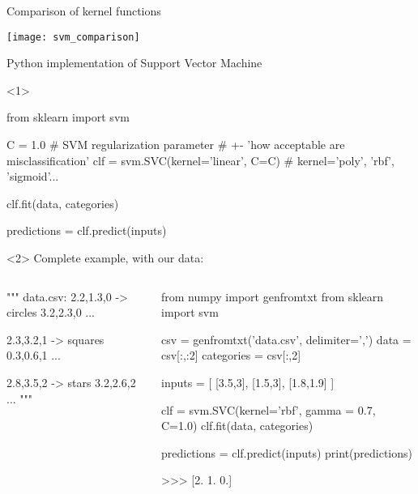 \documentclass[compress]{beamer}
\begin{document}
\begin{frame}{Comparison of kernel functions}
    \begin{center}
        \texttt{[image: svm\_comparison]}
    \end{center}
\end{frame}

\begin{frame}[fragile]{Python implementation of Support Vector Machine}

\begin{onlyenv}<1>

\begin{pythoncode}
from sklearn import svm

C = 1.0  # SVM regularization parameter 
         # +- 'how acceptable are misclassification'
clf = svm.SVC(kernel='linear', C=C) # kernel='poly', 'rbf', 'sigmoid'...

clf.fit(data, categories)

predictions = clf.predict(inputs)
\end{pythoncode}

\end{onlyenv}

\begin{onlyenv}<2>
    Complete example, with our data:

\begin{columns}
    \begin{column}{0.4\linewidth}
\begin{pythoncode}
""" data.csv:
2.2,1.3,0 -> circles
3.2,2.3,0
...

2.3,3.2,1 -> squares
0.3,0.6,1
...

2.8,3.5,2 -> stars
3.2,2.6,2
...
"""
\end{pythoncode}
        
    \end{column}
    \begin{column}{0.6\linewidth}
\begin{pythoncode}
from numpy import genfromtxt
from sklearn import svm

csv = genfromtxt('data.csv', delimiter=',')
data = csv[:,:2]
categories = csv[:,2]


inputs = [ [3.5,3], [1.5,3], [1.8,1.9] ]

clf = svm.SVC(kernel='rbf',
              gamma = 0.7,
              C=1.0)
clf.fit(data, categories)

predictions = clf.predict(inputs)
print(predictions)

>>>  [2.  1.  0.]

\end{pythoncode}
    \end{column}
\end{columns}

\end{onlyenv}


\end{frame}
\end{document}
